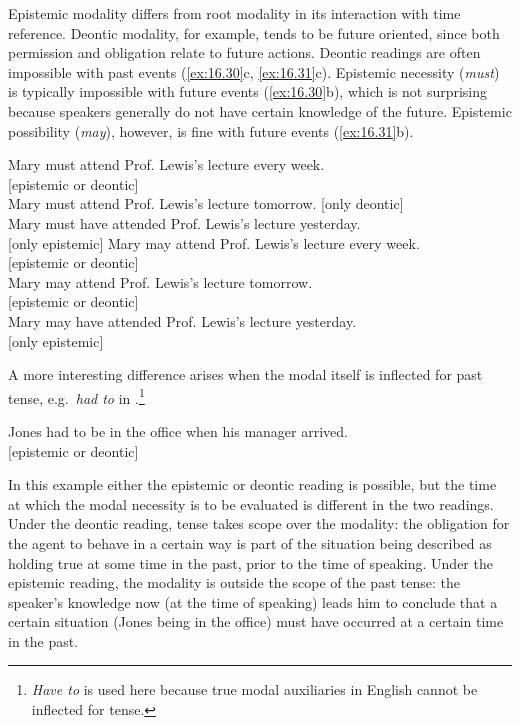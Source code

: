 Epistemic modality differs from root modality in its interaction with time reference. Deontic modality, for example, tends to be future oriented, since both permission and obligation relate to future actions. Deontic readings are often impossible with past events (\ref{ex:16.30}c, \ref{ex:16.31}c).  Epistemic necessity (\textit{must}) is typically impossible with future events (\ref{ex:16.30}b), which is not surprising because speakers generally do not have certain knowledge of the future. Epistemic possibility (\textit{may}), however, is fine with future events (\ref{ex:16.31}b). 


\ea \label{ex:16.30}
\ea  Mary must attend Prof. Lewis’s lecture every week. \\ \hfill [epistemic or deontic]\\
\ex Mary must attend Prof. Lewis’s lecture tomorrow.                  \hfill [only deontic]\\
\ex Mary must have attended Prof. Lewis’s lecture yesterday. \\  \hfill [only epistemic]
                       \z
\ex \label{ex:16.31}
\ea  Mary may attend Prof. Lewis’s lecture every week. \\ \hfill [epistemic or deontic]\\
\ex Mary may attend Prof. Lewis’s lecture tomorrow.  \\  \hfill [epistemic or deontic]\\
\ex Mary may have attended Prof. Lewis’s lecture yesterday. \\  \hfill [only epistemic]
                       \z
\z


A more interesting difference arises when the modal itself is inflected for past tense, e.g.~\textit{had to} in .\footnote{\textit{Have to} is used here because true modal auxiliaries in English cannot be inflected for tense.}


\ea \label{ex:16.32}
Jones had to be in the office when his manager arrived. \\ \hfill [epistemic or deontic]
\z

In this example either the epistemic or deontic reading is possible, but the time at which the modal necessity is to be evaluated is different in the two readings. Under the deontic reading, tense takes scope over the modality: the obligation for the agent to behave in a certain way is part of the situation being described as holding true at some time in the past, prior to the time of speaking. Under the epistemic reading, the modality is outside the scope of the past tense: the speaker’s knowledge now (at the time of speaking) leads him to conclude that a certain situation (Jones being in the office) must have occurred at a certain time in the past.


